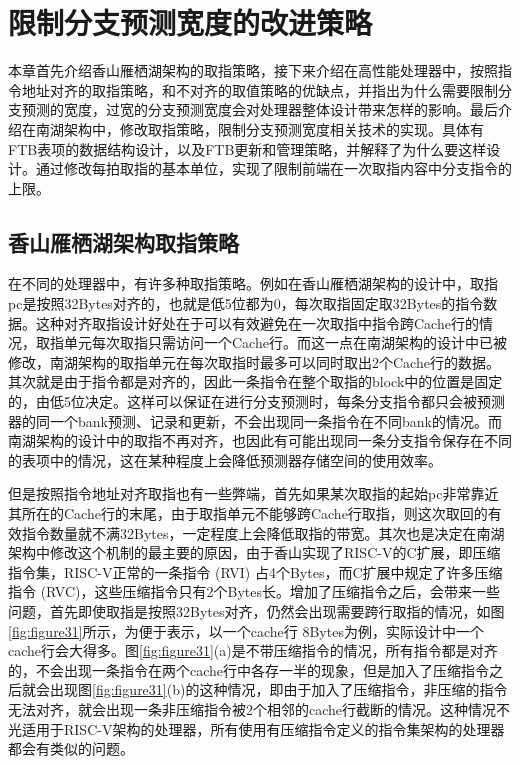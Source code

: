 \chapter{限制分支预测宽度的改进策略}

本章首先介绍香山雁栖湖架构的取指策略，接下来介绍在高性能处理器中，按照指令地址对齐的取指策略，和不对齐的取值策略的优缺点，并指出为什么需要限制分支预测的宽度，过宽的分支预测宽度会对处理器整体设计带来怎样的影响。最后介绍在南湖架构中，修改取指策略，限制分支预测宽度相关技术的实现。具体有FTB表项的数据结构设计，以及FTB更新和管理策略，并解释了为什么要这样设计。通过修改每拍取指的基本单位，实现了限制前端在一次取指内容中分支指令的上限。

\section{香山雁栖湖架构取指策略}

在不同的处理器中，有许多种取指策略。例如在香山雁栖湖架构的设计中，取指pc是按照32Bytes对齐的，也就是低5位都为0，每次取指固定取32Bytes的指令数据。这种对齐取指设计好处在于可以有效避免在一次取指中指令跨Cache行的情况，取指单元每次取指只需访问一个Cache行。而这一点在南湖架构的设计中已被修改，南湖架构的取指单元在每次取指时最多可以同时取出2个Cache行的数据。其次就是由于指令都是对齐的，因此一条指令在整个取指的block中的位置是固定的，由低5位决定。这样可以保证在进行分支预测时，每条分支指令都只会被预测器的同一个bank预测、记录和更新，不会出现同一条指令在不同bank的情况。而南湖架构的设计中的取指不再对齐，也因此有可能出现同一条分支指令保存在不同的表项中的情况，这在某种程度上会降低预测器存储空间的使用效率。

但是按照指令地址对齐取指也有一些弊端，首先如果某次取指的起始pc非常靠近其所在的Cache行的末尾，由于取指单元不能够跨Cache行取指，则这次取回的有效指令数量就不满32Bytes，一定程度上会降低取指的带宽。其次也是决定在南湖架构中修改这个机制的最主要的原因，由于香山实现了RISC-V的C扩展，即压缩指令集，RISC-V正常的一条指令 (RVI) 占4个Bytes，而C扩展中规定了许多压缩指令 (RVC)，这些压缩指令只有2个Bytes长。增加了压缩指令之后，会带来一些问题，首先即使取指是按照32Bytes对齐，仍然会出现需要跨行取指的情况，如图\ref{fig:figure31}所示，为便于表示，以一个cache行 8Bytes为例，实际设计中一个cache行会大得多。图\ref{fig:figure31}(a)是不带压缩指令的情况，所有指令都是对齐的，不会出现一条指令在两个cache行中各存一半的现象，但是加入了压缩指令之后就会出现图\ref{fig:figure31}(b)的这种情况，即由于加入了压缩指令，非压缩的指令无法对齐，就会出现一条非压缩指令被2个相邻的cache行截断的情况。这种情况不光适用于RISC-V架构的处理器，所有使用有压缩指令定义的指令集架构的处理器都会有类似的问题。

